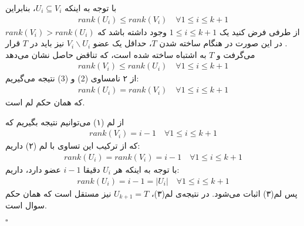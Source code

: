 \documentclass[a4paper,12pt]{article}
\begin{document}
\proof{}
با توجه به اینکه
$U_i \subseteq V_i$،
بنابراین 
\begin{align}
	rank(U_i) \leq rank(V_i) \quad \forall 1 \leq i \leq k+1
\end{align}
از طرفی فرض کنید یک 
$1 \leq i \leq k+1$
وجود داشته باشد که
$rank(V_i) > rank(U_i)$.
در این صورت در هنگام ساخته شدن $T$، حداقل یک عضو 
$V_i \backslash U_i$
نیز باید در $T$ قرار می‌گرفت و $T$ به اشتباه ساخته شده است، که تناقض حاصل نشان می‌دهد 
\begin{align}
	rank(V_i) \leq rank(U_i) \quad \forall 1 \leq i \leq k+1
\end{align}
از ۲ نامساوی (2) و (3) نتیجه می‌گیریم:
\begin{align}
	rank(U_i) = rank(V_i) \quad \forall 1 \leq i \leq k + 1
\end{align}
که همان حکم لم است.

\proof{}
از لم (۱) می‌توانیم نتیجه بگیریم که
\begin{align*}
	rank(V_i) = i - 1 \quad \forall 1 \leq i \leq k+1
\end{align*}
که از ترکیب این تساوی با لم (۲) داریم:
\begin{align*}
	rank(U_i) = rank(V_i) = i - 1 \quad \forall 1 \leq i \leq k + 1
\end{align*}
با توجه به اینکه هر $U_i$ دقیقا $i - 1$ عضو دارد، داریم:
\begin{align*}
	rank(U_i) = i - 1 = |U_i| \quad \forall 1 \leq i \leq k + 1
\end{align*}
پس لم(۳) اثبات می‌شود.
\newline
\newline
در نتیجه‌ی  لم(۳)، 
$U_{k+1} = T$
نیز مستقل است که همان حکم سوال است.
\begin{latin}
	$\square$
\end{latin}
\end{document}
